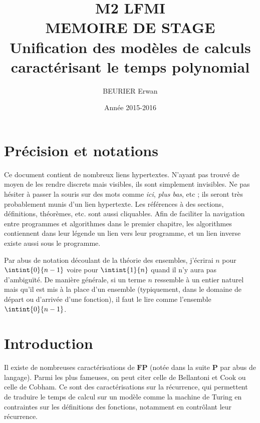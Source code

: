 \documentclass{report}
\author{BEURIER Erwan}
\title{M2 LFMI \\ MEMOIRE DE STAGE \\ Unification des modèles de calculs caractérisant le temps polynomial}
\date{Année 2015-2016}
\begin{document}
	
	\maketitle
	
	\pagebreak
	
	\section*{Précision et notations}
	\label{sec:Notations}
	
	Ce document contient de nombreux liens hypertextes. N'ayant pas trouvé de moyen de les rendre discrets mais visibles, ils sont simplement invisibles. Ne pas hésiter à passer la souris sur des mots comme \emph{ici}, \emph{plus bas}, etc ; ils seront très probablement munis d'un lien hypertexte. Les références à des sections, définitions, théorèmes, etc. sont aussi cliquables. Afin de faciliter la navigation entre programmes et algorithmes dans le premier chapitre, les algorithmes contiennent dans leur légende un lien vers leur programme, et un lien inverse existe aussi sous le programme.
	
	Par abus de notation découlant de la théorie des ensembles, j'écrirai $n$ pour $\intint{0}{n-1}$ voire pour $\intint{1}{n}$ quand il n'y aura pas d'ambiguïté. De manière générale, si un terme $n$ ressemble à un entier naturel mais qu'il est mis à la place d'un ensemble (typiquement, dans le domaine de départ ou d'arrivée d'une fonction), il faut le lire comme l'ensemble $\intint{0}{n-1}$.
	
%	
%	
	
	\pagebreak
	
	
	
	\tableofcontents
	
	
	\pagebreak
	
	
	\section*{Introduction}
	
	Il existe de nombreuses caractérisations de $\textbf{FP}$ (notée dans la suite $\textbf{P}$ par abus de langage). Parmi les plus fameuses, on peut citer celle de Bellantoni et Cook \cite{BellantoniCook1992} ou celle de Cobham. Ce sont des caractérisations sur la récurrence, qui permettent de traduire le temps de calcul sur un modèle comme la machine de Turing en contraintes sur les définitions des fonctions, notamment en contrôlant leur récurrence. 
	
\end{document}
